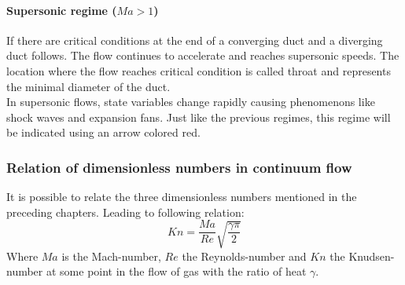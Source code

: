 	\paragraph{Supersonic regime ($Ma > 1$)} 
		If there are critical conditions at the end of a converging duct and a diverging duct follows.
		The flow continues to accelerate and reaches supersonic speeds.
		The location where the flow reaches critical condition is called throat and represents the minimal diameter of the duct.\\
		In supersonic flows, state variables change rapidly causing phenomenons like shock waves and expansion fans.
		Just like the previous regimes, this regime will be indicated using an arrow colored red.
		

\subsubsection*{Relation of dimensionless numbers in continuum flow}
	It is possible to relate the three dimensionless numbers mentioned in the preceding chapters.
	Leading to following relation:
	\begin{equation}
		Kn = \frac{Ma}{Re}\sqrt{\frac{\gamma \pi}{2}}
	\end{equation}
	Where $Ma$ is the Mach-number, $Re$ the Reynolds-number and $Kn$ the Knudsen-number at some point in the flow of gas with the ratio of heat $\gamma$.
